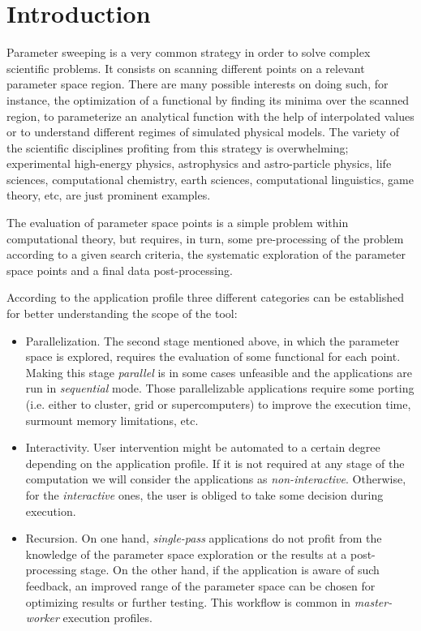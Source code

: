 \documentclass[12pt,a4paper]{article}
\begin{document}
\section{Introduction}
Parameter sweeping is a very common strategy in order to solve complex scientific problems. It consists on scanning different points on a relevant parameter space region. There are many possible interests on doing such, for instance, the optimization of a functional by finding its minima over the scanned region, to parameterize an analytical function with the help of interpolated values or to understand different regimes of simulated physical models. The variety of the scientific disciplines profiting from this strategy is overwhelming; experimental high-energy physics, astrophysics and astro-particle physics, life sciences, computational chemistry,  earth sciences, computational linguistics, game theory, etc, are just prominent examples.

The evaluation of parameter space points is a simple problem within computational theory, but requires, in turn, some pre-processing of the problem according to a given search criteria, the systematic exploration of the parameter space points and a final data post-processing.

According to the application profile three different categories can be established for better understanding the scope of the tool:
\begin{itemize}
\item Parallelization. The second stage mentioned above, in which the parameter space is explored, requires the evaluation of some functional for each point. Making this stage {\em parallel} is in some cases unfeasible and the applications are run in {\em sequential} mode. Those parallelizable applications require some porting (i.e. either to cluster, grid or supercomputers) to improve the execution time, surmount memory limitations, etc.
\item Interactivity. User intervention might be automated to a certain degree depending on the application profile. If it is not required at any stage of the computation we will consider the applications as {\em non-interactive}. Otherwise, for the {\em interactive} ones, the user is obliged to take some decision during execution.
\item Recursion. On one hand, {\em single-pass} applications do not profit from the knowledge of the parameter space exploration or the results at a post-processing stage. On the other hand, if the application is aware of such feedback, an improved range of the parameter space can be chosen for optimizing results or further testing. This workflow is common in {\em master-worker} execution profiles.
\end{itemize}
\end{document}
